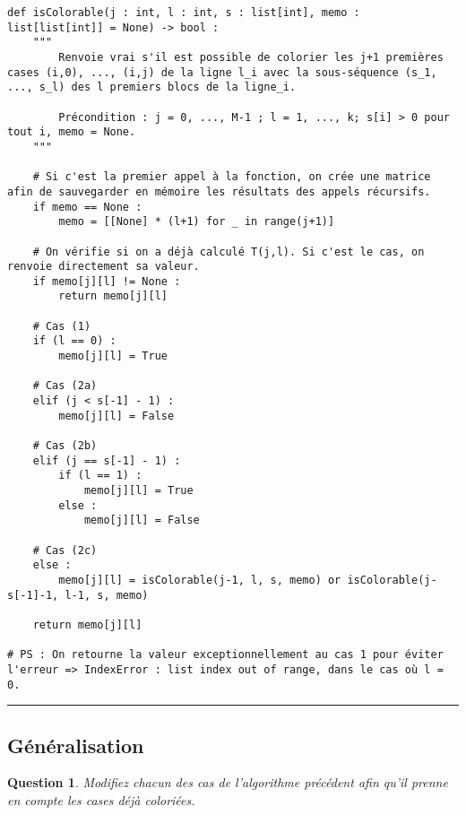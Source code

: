 \documentclass[a4paper,12pt]{article}
\newtheorem{exo}{Question}
\begin{document}
\begin{lstlisting}
def isColorable(j : int, l : int, s : list[int], memo : list[list[int]] = None) -> bool :
    """
        Renvoie vrai s'il est possible de colorier les j+1 premières cases (i,0), ..., (i,j) de la ligne l_i avec la sous-séquence (s_1, ..., s_l) des l premiers blocs de la ligne_i.
    
        Précondition : j = 0, ..., M-1 ; l = 1, ..., k; s[i] > 0 pour tout i, memo = None.
    """
    
    # Si c'est la premier appel à la fonction, on crée une matrice afin de sauvegarder en mémoire les résultats des appels récursifs.
    if memo == None :
        memo = [[None] * (l+1) for _ in range(j+1)]
        
    # On vérifie si on a déjà calculé T(j,l). Si c'est le cas, on renvoie directement sa valeur.
    if memo[j][l] != None :
        return memo[j][l]
    
    # Cas (1)
    if (l == 0) :
        memo[j][l] = True
        
    # Cas (2a)
    elif (j < s[-1] - 1) :
        memo[j][l] = False
        
    # Cas (2b)
    elif (j == s[-1] - 1) :
        if (l == 1) :
            memo[j][l] = True
        else :
            memo[j][l] = False
    
    # Cas (2c)  
    else :
        memo[j][l] = isColorable(j-1, l, s, memo) or isColorable(j-s[-1]-1, l-1, s, memo)
        
    return memo[j][l]

# PS : On retourne la valeur exceptionnellement au cas 1 pour éviter l'erreur => IndexError : list index out of range, dans le cas où l = 0.
\end{lstlisting}

\noindent\rule{\textwidth}{1pt}
\newpage


\subsection{Généralisation}


\begin{exo}
	Modifiez chacun des cas de l'algorithme précédent afin qu'il prenne en compte les cases déjà coloriées.
\end{exo}

\end{document}
